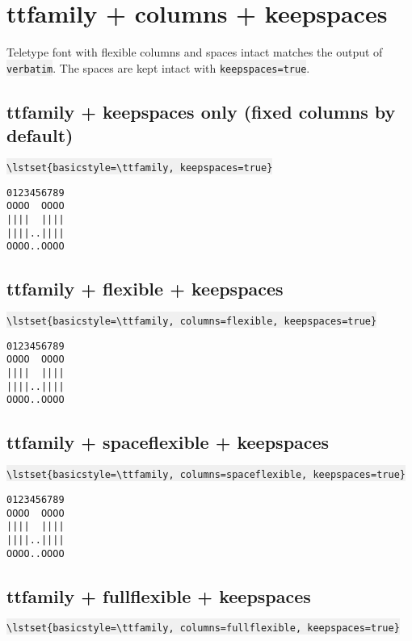 \documentclass{article}
\newcommand{\bs}{\textbackslash}
\newcommand{\ttt}[1]{\colorbox[HTML]{f0f0f0}{\texttt{#1}}}
\begin{document}
\section{ttfamily + columns + keepspaces}
Teletype font with flexible columns and spaces intact matches the output
of \ttt{verbatim}. The spaces are kept intact with \ttt{keepspaces=true}.

\subsection{ttfamily + keepspaces only (fixed columns by default)}
\ttt{\bs{}lstset\{basicstyle=\bs{}ttfamily, keepspaces=true\}}

{
\lstset{basicstyle=\ttfamily, keepspaces=true}
\begin{lstlisting}
0123456789
OOOO  OOOO
||||  ||||
||||..||||
OOOO..OOOO
\end{lstlisting}
}

\subsection{ttfamily + flexible + keepspaces}
\ttt{\bs{}lstset\{basicstyle=\bs{}ttfamily, columns=flexible,
                     keepspaces=true\}}

{
\lstset{basicstyle=\ttfamily, columns=flexible, keepspaces=true}
\begin{lstlisting}
0123456789
OOOO  OOOO
||||  ||||
||||..||||
OOOO..OOOO
\end{lstlisting}
}

\subsection{ttfamily + spaceflexible + keepspaces}
\ttt{\bs{}lstset\{basicstyle=\bs{}ttfamily, columns=spaceflexible,
                     keepspaces=true\}}
{
\lstset{basicstyle=\ttfamily, columns=spaceflexible, keepspaces=true}
\begin{lstlisting}
0123456789
OOOO  OOOO
||||  ||||
||||..||||
OOOO..OOOO
\end{lstlisting}
}

\subsection{ttfamily + fullflexible + keepspaces}
\ttt{\bs{}lstset\{basicstyle=\bs{}ttfamily, columns=fullflexible,
                     keepspaces=true\}}
\end{document}
